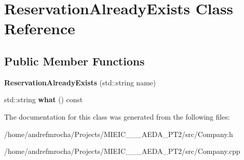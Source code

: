 \hypertarget{class_reservation_already_exists}{}\section{Reservation\+Already\+Exists Class Reference}
\label{class_reservation_already_exists}
\subsection*{Public Member Functions}
\begin{DoxyCompactItemize}
\item 
\mbox{\label{class_reservation_already_exists_aa1680492cc43e3b30695113bf6a01aab}} 
{\bfseries Reservation\+Already\+Exists} (std\+::string name)
\item 
\mbox{\label{class_reservation_already_exists_a01010ef1db3c0be023dc9a2197a5cca4}} 
std\+::string {\bfseries what} () const
\end{DoxyCompactItemize}


The documentation for this class was generated from the following files\+:\begin{DoxyCompactItemize}
\item 
/home/andrefmrocha/\+Projects/\+M\+I\+E\+I\+C\+\_\+\_\+\_\+\+A\+E\+D\+A\+\_\+\+P\+T2/src/Company.\+h\item 
/home/andrefmrocha/\+Projects/\+M\+I\+E\+I\+C\+\_\+\_\+\_\+\+A\+E\+D\+A\+\_\+\+P\+T2/src/Company.\+cpp\end{DoxyCompactItemize}
